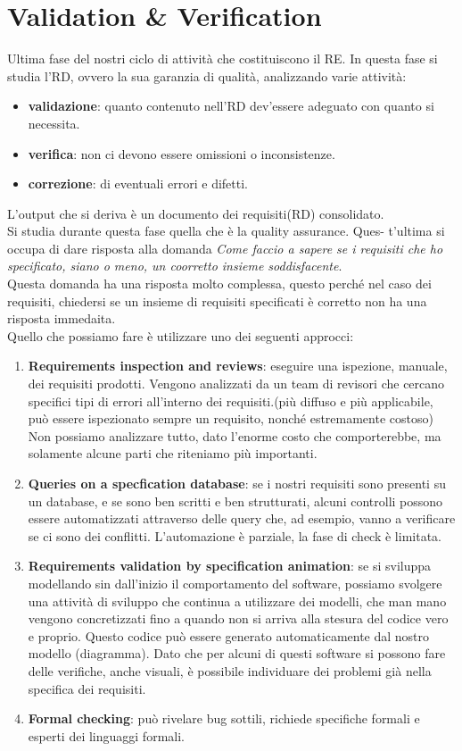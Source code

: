 \section{Validation \& Verification}
Ultima fase del nostri ciclo di attività che costituiscono il RE. In questa fase si studia l’RD, ovvero la sua garanzia di qualità, analizzando varie attività:
\begin{itemize}
    \item \textbf{validazione}: quanto contenuto nell’RD dev’essere adeguato con quanto si necessita.
    \item \textbf{verifica}: non ci devono essere omissioni o inconsistenze.
    \item \textbf{correzione}: di eventuali errori e difetti.
\end{itemize}
L'output che si deriva è un documento dei requisiti(RD) consolidato.\\
Si studia durante questa fase quella che è la quality assurance. Ques-  t'ultima si occupa di dare risposta alla domanda \textit{Come faccio a sapere se i requisiti che ho specificato, siano o meno, un coorretto insieme soddisfacente}.\\
Questa domanda ha una risposta molto complessa, questo perché nel caso dei requisiti, chiedersi se un insieme di requisiti specificati è corretto non ha una risposta immedaita.\\
Quello che possiamo fare è utilizzare uno dei seguenti approcci:
\begin{enumerate}
    \item \textbf{Requirements inspection and reviews}: eseguire una ispezione, manuale, dei requisiti prodotti. Vengono analizzati da un team di revisori che cercano specifici tipi di errori all'interno dei requisiti.(più diffuso e più applicabile, può essere ispezionato sempre un requisito, nonché estremamente costoso)\\
    Non possiamo analizzare tutto, dato l'enorme costo che comporterebbe, ma solamente alcune parti che riteniamo più importanti. 
    \item \textbf{Queries on a specfication database}: se i nostri requisiti sono presenti su un database, e se sono ben scritti e ben strutturati, alcuni controlli possono essere automatizzati attraverso delle query che, ad esempio, vanno a verificare se ci sono dei conflitti. L'automazione è parziale, la fase di check è limitata. 
    \item \textbf{Requirements validation by specification animation}: se si sviluppa modellando sin dall'inizio il comportamento del software, possiamo svolgere una attività di sviluppo che continua a utilizzare dei modelli, che man mano vengono concretizzati fino a quando non si arriva alla stesura del codice vero e proprio. Questo codice può essere generato automaticamente dal nostro modello (diagramma). Dato che per alcuni di questi software si possono fare delle verifiche, anche visuali, è possibile individuare dei problemi già nella specifica dei requisiti. 
    \item \textbf{Formal checking}: può rivelare bug sottili, richiede specifiche formali e esperti dei linguaggi formali.
\end{enumerate}

